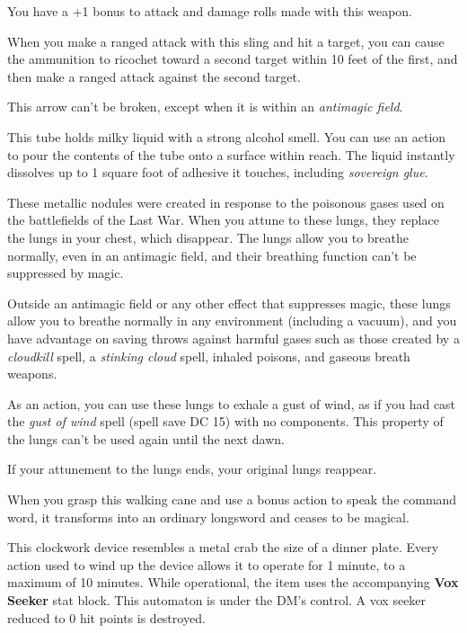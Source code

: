 \documentclass[10pt,a4paper,twoside,bg=print,twocolumn,openany,nodeprecatedcode]{dndbook}
\begin{document}
You have a +1 bonus to attack and damage rolls made with this weapon.

When you make a ranged attack with this sling and hit a target, you can cause the ammunition to ricochet toward a second target within 10 feet of the first, and then make a ranged attack against the second target.

This arrow can't be broken, except when it is within an \textit{antimagic field}.

This tube holds milky liquid with a strong alcohol smell. You can use an action to pour the contents of the tube onto a surface within reach. The liquid instantly dissolves up to 1 square foot of adhesive it touches, including \textit{sovereign glue}.

These metallic nodules were created in response to the poisonous gases used on the battlefields of the Last War. When you attune to these lungs, they replace the lungs in your chest, which disappear. The lungs allow you to breathe normally, even in an antimagic field, and their breathing function can't be suppressed by magic.

Outside an antimagic field or any other effect that suppresses magic, these lungs allow you to breathe normally in any environment (including a vacuum), and you have advantage on saving throws against harmful gases such as those created by a \textit{cloudkill} spell, a \textit{stinking cloud} spell, inhaled poisons, and gaseous breath weapons.

As an action, you can use these lungs to exhale a gust of wind, as if you had cast the \textit{gust of wind} spell (spell save DC 15) with no components. This property of the lungs can't be used again until the next dawn.

If your attunement to the lungs ends, your original lungs reappear.

When you grasp this walking cane and use a bonus action to speak the command word, it transforms into an ordinary longsword and ceases to be magical.

This clockwork device resembles a metal crab the size of a dinner plate. Every action used to wind up the device allows it to operate for 1 minute, to a maximum of 10 minutes. While operational, the item uses the accompanying \textbf{Vox Seeker} stat block. This automaton is under the DM's control. A vox seeker reduced to 0 hit points is destroyed.
\end{document}
